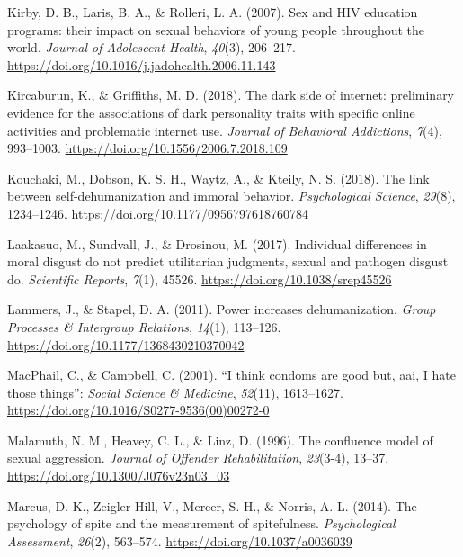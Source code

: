 \documentclass[
  english,
  donotrepeattitle,doc, 12pt, a4paper,floatsintext]{apa7}
\newlength{\cslhangindent}
\newlength{\cslentryspacingunit} %
\newenvironment{CSLReferences}[2] %
 {%
  \setlength{\parindent}{0pt}
  \ifodd #1
  \let\oldpar\par
  \def\par{\hangindent=\cslhangindent\oldpar}
  \fi
  \setlength{\parskip}{#2\cslentryspacingunit}
 }%
 {}
\begin{document}
\begin{CSLReferences}{1}{0}
\leavevmode{}%
Kirby, D. B., Laris, B. A., \& Rolleri, L. A. (2007). Sex and HIV education programs: their impact on sexual behaviors of young people throughout the world. \emph{Journal of Adolescent Health}, \emph{40}(3), 206--217. \url{https://doi.org/10.1016/j.jadohealth.2006.11.143}

\leavevmode{}%
Kircaburun, K., \& Griffiths, M. D. (2018). The dark side of internet: preliminary evidence for the associations of dark personality traits with specific online activities and problematic internet use. \emph{Journal of Behavioral Addictions}, \emph{7}(4), 993--1003. \url{https://doi.org/10.1556/2006.7.2018.109}

\leavevmode{}%
Kouchaki, M., Dobson, K. S. H., Waytz, A., \& Kteily, N. S. (2018). The link between self-dehumanization and immoral behavior. \emph{Psychological Science}, \emph{29}(8), 1234--1246. \url{https://doi.org/10.1177/0956797618760784}

\leavevmode{}%
Laakasuo, M., Sundvall, J., \& Drosinou, M. (2017). Individual differences in moral disgust do not predict utilitarian judgments, sexual and pathogen disgust do. \emph{Scientific Reports}, \emph{7}(1), 45526. \url{https://doi.org/10.1038/srep45526}

\leavevmode{}%
Lammers, J., \& Stapel, D. A. (2011). Power increases dehumanization. \emph{Group Processes \& Intergroup Relations}, \emph{14}(1), 113--126. \url{https://doi.org/10.1177/1368430210370042}

\leavevmode{}%
MacPhail, C., \& Campbell, C. (2001). {``I think condoms are good but, aai, I hate those things''}: \emph{Social Science \& Medicine}, \emph{52}(11), 1613--1627. \url{https://doi.org/10.1016/S0277-9536(00)00272-0}

\leavevmode{}%
Malamuth, N. M., Heavey, C. L., \& Linz, D. (1996). The confluence model of sexual aggression. \emph{Journal of Offender Rehabilitation}, \emph{23}(3-4), 13--37. \url{https://doi.org/10.1300/J076v23n03_03}

\leavevmode{}%
Marcus, D. K., Zeigler-Hill, V., Mercer, S. H., \& Norris, A. L. (2014). The psychology of spite and the measurement of spitefulness. \emph{Psychological Assessment}, \emph{26}(2), 563--574. \url{https://doi.org/10.1037/a0036039}


\end{CSLReferences}
\end{document}
